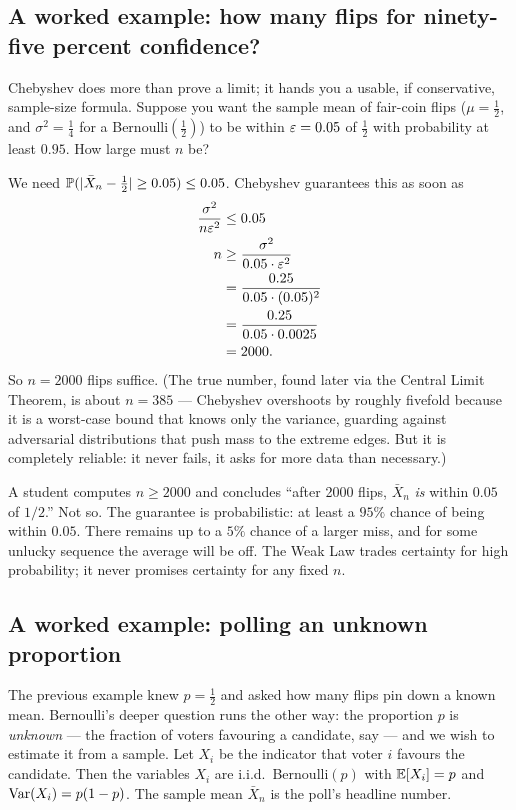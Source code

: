 \subsection{A worked example: how many flips for ninety-five percent confidence?}

Chebyshev does more than prove a limit; it hands you a usable, if conservative, sample-size formula. Suppose you want the sample mean of fair-coin flips ($\mu=\tfrac12$, and $\sigma^2 = \tfrac14$ for a Bernoulli$(\tfrac12)$) to be within $\varepsilon = 0.05$ of $\tfrac12$ with probability at least $0.95$. How large must $n$ be?

We need $\operatorname{\mathbb{P}}(\lvert\bar X_n - \tfrac12\rvert \ge 0.05) \le 0.05$. Chebyshev guarantees this as soon as
\begin{align*}
  \frac{\sigma^2}{n\varepsilon^2} &\le 0.05 \\
  n &\ge \frac{\sigma^2}{0.05 \cdot \varepsilon^2} \\
  &= \frac{0.25}{0.05 \cdot (0.05)^2} \\
  &= \frac{0.25}{0.05 \cdot 0.0025} \\
  &= 2000.
\end{align*}
So $n = 2000$ flips suffice. (The true number, found later via the Central Limit Theorem, is about $n=385$ --- Chebyshev overshoots by roughly fivefold because it is a worst-case bound that knows only the variance, guarding against adversarial distributions that push mass to the extreme edges. But it is completely reliable: it never fails, it asks for more data than necessary.)

\begin{trapbox}
A student computes $n \ge 2000$ and concludes ``after 2000 flips, $\bar X_n$ \emph{is} within $0.05$ of $1/2$.'' Not so. The guarantee is probabilistic: at least a $95\%$ chance of being within $0.05$. There remains up to a $5\%$ chance of a larger miss, and for some unlucky sequence the average will be off. The Weak Law trades certainty for high probability; it never promises certainty for any fixed $n$.
\end{trapbox}

\subsection{A worked example: polling an unknown proportion}

The previous example knew $p=\tfrac12$ and asked how many flips pin down a known mean. Bernoulli's deeper question runs the other way: the proportion $p$ is \emph{unknown} --- the fraction of voters favouring a candidate, say --- and we wish to estimate it from a sample. Let $X_i$ be the indicator that voter $i$ favours the candidate. Then the variables $X_i$ are i.i.d.\ Bernoulli$(p)$ with $\operatorname{\mathbb{E}}[X_i]=p$ and $\operatorname{Var}(X_i)=p(1-p)$. The sample mean $\bar X_n$ is the poll's headline number.

